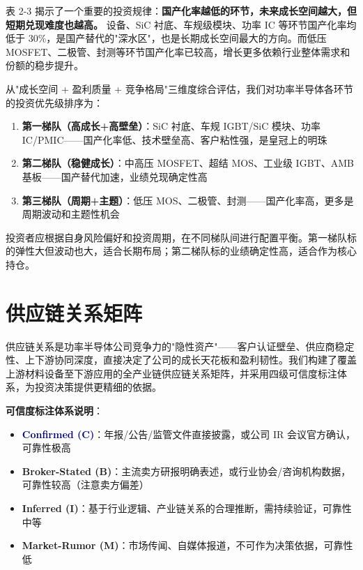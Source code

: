 表 2-3 揭示了一个重要的投资规律：\textbf{国产化率越低的环节，未来成长空间越大，但短期兑现难度也越高。} 设备、SiC 衬底、车规级模块、功率 IC 等环节国产化率均低于 30\%，是国产替代的"深水区"，也是长期成长空间最大的方向。而低压 MOSFET、二极管、封测等环节国产化率已较高，增长更多依赖行业整体需求和份额的稳步提升。

\begin{keyinsight}[价值分配视角下的投资排序]
从"成长空间 + 盈利质量 + 竞争格局"三维度综合评估，我们对功率半导体各环节的投资优先级排序为：
\vspace{0.3em}
\begin{enumerate}[leftmargin=2em]
\item \textbf{第一梯队（高成长+高壁垒）}：SiC 衬底、车规 IGBT/SiC 模块、功率 IC/PMIC——国产化率低、技术壁垒高、客户粘性强，是皇冠上的明珠
\item \textbf{第二梯队（稳健成长）}：中高压 MOSFET、超结 MOS、工业级 IGBT、AMB 基板——国产替代加速，业绩兑现确定性高
\item \textbf{第三梯队（周期+主题）}：低压 MOS、二极管、封测——国产化率高，更多是周期波动和主题性机会
\end{enumerate}
\vspace{0.3em}
投资者应根据自身风险偏好和投资周期，在不同梯队间进行配置平衡。第一梯队标的弹性大但波动也大，适合长期布局；第二梯队标的业绩确定性高，适合作为核心持仓。
\end{keyinsight}

\section{供应链关系矩阵}

供应链关系是功率半导体公司竞争力的"隐性资产"——客户认证壁垒、供应商稳定性、上下游协同深度，直接决定了公司的成长天花板和盈利韧性。我们构建了覆盖上游材料设备至下游应用的全产业链供应链关系矩阵，并采用四级可信度标注体系，为投资决策提供更精细的依据。

\vspace{0.3em}

\textbf{可信度标注体系说明}：
\begin{itemize}[leftmargin=2em]
\item \textbf{\textcolor{navy}{Confirmed (C)}}：年报/公告/监管文件直接披露，或公司 IR 会议官方确认，可靠性极高
\item \textbf{\textcolor{riskgreen}{Broker-Stated (B)}}：主流卖方研报明确表述，或行业协会/咨询机构数据，可靠性较高（注意卖方偏差）
\item \textbf{\textcolor{riskamber}{Inferred (I)}}：基于行业逻辑、产业链关系的合理推断，需持续验证，可靠性中等
\item \textbf{\textcolor{riskred}{Market-Rumor (M)}}：市场传闻、自媒体报道，不可作为决策依据，可靠性低
\end{itemize}

